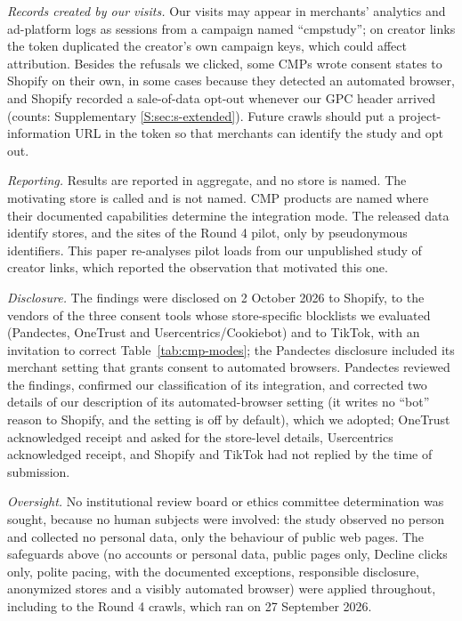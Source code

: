 \emph{Records created by our visits.} Our visits may appear in merchants' analytics and ad-platform logs as sessions from a campaign named ``cmpstudy''; on creator links the token duplicated the creator's own campaign keys, which could affect attribution. Besides the refusals we clicked, some CMPs wrote consent states to Shopify on their own, in some cases because they detected an automated browser, and Shopify recorded a sale-of-data opt-out whenever our GPC header arrived (counts: Supplementary \ref*{S:sec:s-extended}). Future crawls should put a project-information URL in the token so that merchants can identify the study and opt out.

\emph{Reporting.} Results are reported in aggregate, and no store is named. The motivating store is called \storeC and is not named. CMP products are named where their documented capabilities determine the integration mode. The released data identify stores, and the sites of the Round 4 pilot, only by pseudonymous identifiers. This paper re-analyses pilot loads from our unpublished study of creator links, which reported the \storeC observation that motivated this one.

\emph{Disclosure.} The findings were disclosed on 2 October 2026 to Shopify, to the vendors of the three consent tools whose store-specific blocklists we evaluated (Pandectes, OneTrust and Usercentrics/Cookiebot) and to TikTok, with an invitation to correct Table~\ref{tab:cmp-modes}; the Pandectes disclosure included its merchant setting that grants consent to automated browsers. Pandectes reviewed the findings, confirmed our classification of its integration, and corrected two details of our description of its automated-browser setting (it writes no ``bot'' reason to Shopify, and the setting is off by default), which we adopted; OneTrust acknowledged receipt and asked for the store-level details, Usercentrics acknowledged receipt, and Shopify and TikTok had not replied by the time of submission.

\emph{Oversight.} No institutional review board or ethics committee determination was sought, because no human subjects were involved: the study observed no person and collected no personal data, only the behaviour of public web pages. The safeguards above (no accounts or personal data, public pages only, Decline clicks only, polite pacing,  with the documented exceptions, responsible disclosure, anonymized stores and a visibly automated browser) were applied throughout, including to the Round 4 crawls, which ran on 27 September 2026.

